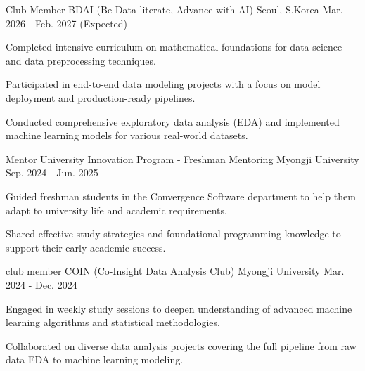 

\begin{cventries}

  \cventry
    {Club Member} %
    {BDAI (Be Data-literate, Advance with AI)} %
    {Seoul, S.Korea} %
    {Mar. 2026 - Feb. 2027 (Expected)} %
    {
      \begin{cvitems} %
        \item {Completed intensive curriculum on mathematical foundations for data science and data preprocessing techniques.}
        \item {Participated in end-to-end data modeling projects with a focus on model deployment and production-ready pipelines.}
        \item {Conducted comprehensive exploratory data analysis (EDA) and implemented machine learning models for various real-world datasets.}
      \end{cvitems}
    }


    \cventry
    {Mentor} %
    {University Innovation Program - Freshman Mentoring} %
    {Myongji University} %
    {Sep. 2024 - Jun. 2025} %
    {
      \begin{cvitems} %
        \item {Guided freshman students in the Convergence Software department to help them adapt to university life and academic requirements.}
        \item {Shared effective study strategies and foundational programming knowledge to support their early academic success.}
      \end{cvitems}
    }


  \cventry
    {club member} %
    {COIN (Co-Insight Data Analysis Club)} %
    {Myongji University} %
    {Mar. 2024 - Dec. 2024} %
    {
      \begin{cvitems} %
      \item {Engaged in weekly study sessions to deepen understanding of advanced machine learning algorithms and statistical methodologies.}
        \item {Collaborated on diverse data analysis projects covering the full pipeline from raw data EDA to machine learning modeling.}
      \end{cvitems}
    }

\end{cventries}

